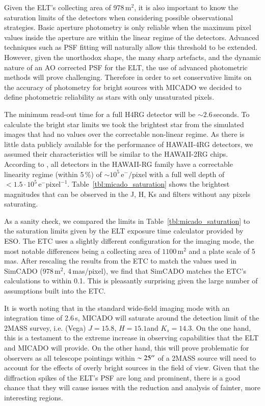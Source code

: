 Given the ELT's collecting area of 978\,m$^2$, it is also important to know the saturation limits of the detectors when considering possible observational strategies.
Basic aperture photometry is only reliable when the maximum pixel values inside the aperture are within the linear regime of the detectors.
Advanced techniques such as PSF fitting will naturally allow this threshold to be extended.
However, given the unorthodox shape, the many sharp artefacts, and the dynamic nature of an AO corrected PSF for the ELT, the use of advanced photometric methods will prove challenging.
Therefore in order to set conservative limits on the accuracy of photometry for bright sources with MICADO we decided to define photometric reliability as stars with only unsaturated pixels.

The minimum read-out time for a full H4RG detector will be $\sim 2.6$\,seconds.
To calculate the bright star limits we took the brightest star from the simulated images that had no values over the correctable non-linear regime.
As there is little data publicly available for the performance of HAWAII-4RG detectors, we assumed their characteristics will be similar to the HAWAII-2RG chips.
According to \citet{hawaii2rg}, all detectors in the HAWAII-RG family have a correctable linearity regime (within 5\,\%) of $\sim 10^{5}\,\mathrm{e}^{-}/\mathrm{pixel}$ with a full well depth of $<1.5 \cdot 10^{5}\,\mathrm{e}^{-}\mathrm{pixel}^{-1}$.
Table~\ref{tbl:micado_saturation} shows the brightest magnitudes that can be observed in the J, H, Ks and \brgamma filters without any pixels saturating. 

As a sanity check, we compared the limits in Table~\ref{tbl:micado_saturation} to the saturation limits given by the ELT exposure time calculator provided by ESO.
The ETC uses a slightly different configuration for the imaging mode, the most notable differences being a collecting area of $1100\,\mathrm{m^2}$ and a plate scale of 5\,mas.
After rescaling the results from the ETC to match the values used in SimCADO (978\,m$^2$, 4\,mas/pixel), we find that SimCADO matches the ETC's calculations to within 0.1\m.
This is pleasantly surprising given the large number of assumptions built into the ETC.

It is worth noting that in the standard wide-field imaging mode with an integration time of 2.6\,s, MICADO will saturate around the detection limit of the 2MASS survey, i.e. (Vega) $J=15.8$\m, $H=15.1$\m and $K_{s}=14.3$\m \citep{2mass}.
On the one hand, this is a testament to the extreme increase in observing capabilities that the ELT and MICADO will provide.
On the other hand, this will prove problematic for observers as all telescope pointings within $\sim 25^{\prime\prime}$ of a 2MASS source will need to account for the effects of overly bright sources in the field of view.
Given that the diffraction spikes of the ELT's PSF are long and prominent, there is a good chance that they will cause issues with the reduction and analysis of fainter, more interesting regions. 



